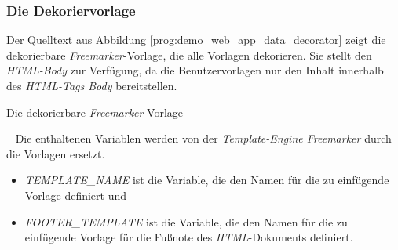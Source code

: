 \subsubsection{Die Dekoriervorlage}
Der Quelltext aus Abbildung \ref{prog:demo_web_app_data_decorator} zeigt die dekorierbare \emph{Freemarker}-Vorlage, die alle Vorlagen dekorieren. Sie stellt den \emph{HTML-Body} zur Verfügung, da die Benutzervorlagen nur den Inhalt innerhalb des \emph{HTML-Tags Body} bereitstellen.
\begin{program}[h]
\caption{Die dekorierbare \emph{Freemarker}-Vorlage}
\label{prog:demo_web_app_data_decorator}
\end{program}
\ \newline
Die enthaltenen Variablen werden von der \emph{Template-Engine Freemarker} durch die Vorlagen ersetzt.
\begin{itemize}
	\item\emph{TEMPLATE\_NAME}
	\newline
	ist die Variable, die den Namen für die zu einfügende Vorlage definiert und
	\item\emph{FOOTER\_TEMPLATE}
	\newline
	ist die Variable, die den Namen für die zu einfügende Vorlage für die Fußnote des \emph{HTML}-Dokuments definiert.
\end{itemize}

